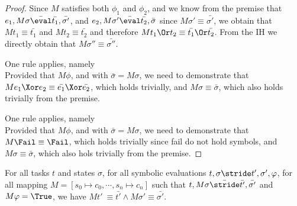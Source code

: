\begin{proof}
{  Since $M$ satisfies both $\phi_1$ and $\phi_2$,
  and we know from the premise that $e_1,M\sigma \bar{\eval}\bar{t_1},\bar{\sigma'}$,
  and $e_2,M\sigma'\bar{\eval}\bar{t_2},\bar{\sigma}$ since $M\sigma'\equiv \bar{\sigma'}$,
  we obtain that $M t_1\equiv \bar{t_1}$ and $M t_2 \equiv \bar{t_2}$ and therefore $M t_1\Or t_2 \equiv \bar{t_1}\Or\bar{t_2}$.
  From the IH we directly obtain that $M \sigma'' \equiv\bar{\sigma''}$.

  }

  {  One rule applies, namely \\
    Provided that $M\phi$, and  with $\bar{\sigma}=M\sigma$,
    we need to demonstrate that $M e_1\Xor e_2 \equiv \bar{e_1}\Xor\bar{e_2}$,
    which holds trivially,
    and $M\sigma\equiv\bar{\sigma}$, which also holds trivially from the premise.

  }

  {  One rule applies, namely \\
    Provided that $M\phi$, and  with $\bar{\sigma}=M\sigma$,
    we need to demonstrate that $M \Fail \equiv \Fail$, which holds trivially since fail do not hold symbols,
    and $M\sigma\equiv\bar{\sigma}$, which also hols trivially from the premise.

  }
\end{proof}

\begin{lemma}
  \label{lem:soundstride}

  For all tasks $t$ and states $\sigma$,
  for all symbolic evaluations $t,\sigma\stride t',\sigma',\phi$,
  for all mapping $M=[s_0\mapsto c_0,\cdots,s_n\mapsto c_n]$
  such that $t,M\sigma \bar{\stride}\bar{t'},\bar{\sigma'}$ and $M \phi= \True$,
  we have $M t'\ \equiv \bar{t'} \land M\sigma' \equiv \bar{\sigma'}$.

\end{lemma}

